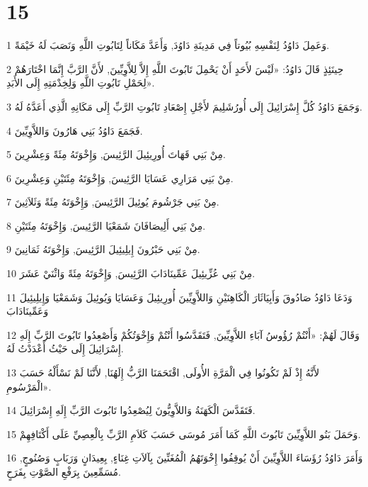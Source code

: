 \chapter{15}

\par 1 وَعَمِلَ دَاوُدُ لِنَفْسِهِ بُيُوتاً فِي مَدِينَةِ دَاوُدَ, وَأَعَدَّ مَكَاناً لِتَابُوتِ اللَّهِ وَنَصَبَ لَهُ خَيْمَةً.
\par 2 حِينَئِذٍ قَالَ دَاوُدُ: «لَيْسَ لأَحَدٍ أَنْ يَحْمِلَ تَابُوتَ اللَّهِ إِلاَّ لِلاَّوِيِّينَ, لأَنَّ الرَّبَّ إِنَّمَا اخْتَارَهُمْ لِحَمْلِ تَابُوتِ اللَّهِ وَلِخِدْمَتِهِ إِلَى الأَبَدِ».
\par 3 وَجَمَعَ دَاوُدُ كُلَّ إِسْرَائِيلَ إِلَى أُورُشَلِيمَ لأَجْلِ إِصْعَادِ تَابُوتِ الرَّبِّ إِلَى مَكَانِهِ الَّذِي أَعَدَّهُ لَهُ.
\par 4 فَجَمَعَ دَاوُدُ بَنِي هَارُونَ وَاللاَّوِيِّينَ.
\par 5 مِنْ بَنِي قَهَاتَ أُورِيئِيلَ الرَّئِيسَ, وَإِخْوَتَهُ مِئَةً وَعِشْرِينَ.
\par 6 مِنْ بَنِي مَرَارِي عَسَايَا الرَّئِيسَ, وَإِخْوَتَهُ مِئَتَيْنِ وَعِشْرِينَ.
\par 7 مِنْ بَنِي جَرْشُومَ يُوئِيلَ الرَّئِيسَ, وَإِخْوَتَهُ مِئَةً وَثَلاَثِينَ.
\par 8 مِنْ بَنِي أَلِيصَافَانَ شَمَعْيَا الرَّئِيسَ, وَإِخْوَتَهُ مِئَتَيْنِ.
\par 9 مِنْ بَنِي حَبْرُونَ إِيلِيئِيلَ الرَّئِيسَ, وَإِخْوَتَهُ ثَمَانِينَ.
\par 10 مِنْ بَنِي عُزِّيئِيلَ عَمِّينَادَابَ الرَّئِيسَ, وَإِخْوَتَهُ مِئَةً وَاثْنَيْ عَشَرَ.
\par 11 وَدَعَا دَاوُدُ صَادُوقَ وَأَبِيَاثَارَ الْكَاهِنَيْنِ وَاللاَّوِيِّينَ أُورِيئِيلَ وَعَسَايَا وَيُوئِيلَ وَشَمَعْيَا وَإِيلِيئِيلَ وَعَمِّينَادَابَ
\par 12 وَقَالَ لَهُمْ: «أَنْتُمْ رُؤُوسُ آبَاءِ اللاَّوِيِّينَ, فَتَقَدَّسُوا أَنْتُمْ وَإِخْوَتُكُمْ وَأَصْعِدُوا تَابُوتَ الرَّبِّ إِلَهِ إِسْرَائِيلَ إِلَى حَيْثُ أَعْدَدْتُ لَهُ.
\par 13 لأَنَّهُ إِذْ لَمْ تَكُونُوا فِي الْمَرَّةِ الأُولَى, اقْتَحَمَنَا الرَّبُّ إِلَهُنَا, لأَنَّنَا لَمْ نَسْأَلْهُ حَسَبَ الْمَرْسُومِ».
\par 14 فَتَقَدَّسَ الْكَهَنَةُ وَاللاَّوِيُّونَ لِيُصْعِدُوا تَابُوتَ الرَّبِّ إِلَهِ إِسْرَائِيلَ.
\par 15 وَحَمَلَ بَنُو اللاَّوِيِّينَ تَابُوتَ اللَّهِ كَمَا أَمَرَ مُوسَى حَسَبَ كَلاَمِ الرَّبِّ بِالْعِصِيِّ عَلَى أَكْتَافِهِمْ.
\par 16 وَأَمَرَ دَاوُدُ رُؤَسَاءَ اللاَّوِيِّينَ أَنْ يُوقِفُوا إِخْوَتَهُمُ الْمُغَنِّينَ بِآلاَتِ غِنَاءٍ, بِعِيدَانٍ وَرَبَابٍ وَصُنُوجٍ, مُسَمِّعِينَ بِرَفْعِ الصَّوْتِ بِفَرَحٍ.
